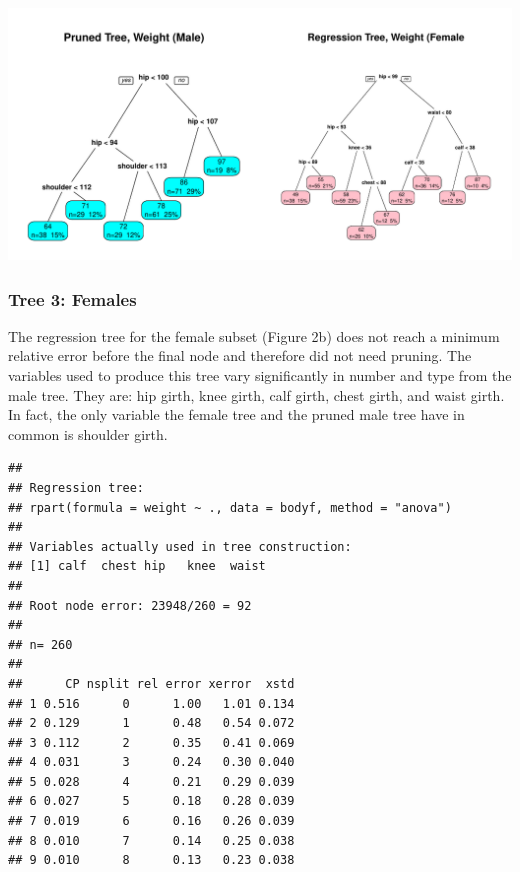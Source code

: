 \documentclass[11pt]{article}\usepackage[]{graphicx}\usepackage[]{color}
\makeatletter
\def\maxwidth{ %
  \ifdim\Gin@nat@width>\linewidth
    \linewidth
  \else
    \Gin@nat@width
  \fi
}
\newenvironment{kframe}{%
 \def\at@end@of@kframe{}%
 \ifinner\ifhmode%
  \def\at@end@of@kframe{\end{minipage}}%
  \begin{minipage}{\columnwidth}%
 \fi\fi%
 \def\FrameCommand##1{\hskip\@totalleftmargin \hskip-\fboxsep
 \colorbox{shadecolor}{##1}\hskip-\fboxsep
     \hskip-\linewidth \hskip-\@totalleftmargin \hskip\columnwidth}%
 \MakeFramed {\advance\hsize-\width
   \@totalleftmargin\z@ \linewidth\hsize
   \@setminipage}}%
 {\par\unskip\endMakeFramed%
 \at@end@of@kframe}
\newenvironment{knitrout}{}{} %
\makeatother
\begin{document}
\begin{knitrout}
\color{fgcolor}
\includegraphics[width=\maxwidth]{figure/mtrees} 

\end{knitrout}



\subsubsection{Tree 3: Females} 
The regression tree for the female subset (Figure 2b) does not reach a minimum relative error before the final node and therefore did not need pruning. The variables used to produce this tree vary significantly in number and type from the male tree. They are: hip girth, knee girth, calf girth, chest girth, and waist girth. In fact, the only variable the female tree and the pruned male tree have in common is shoulder girth.

\begin{knitrout}
\color{fgcolor}\begin{kframe}
\begin{verbatim}
## 
## Regression tree:
## rpart(formula = weight ~ ., data = bodyf, method = "anova")
## 
## Variables actually used in tree construction:
## [1] calf  chest hip   knee  waist
## 
## Root node error: 23948/260 = 92
## 
## n= 260 
## 
##      CP nsplit rel error xerror  xstd
## 1 0.516      0      1.00   1.01 0.134
## 2 0.129      1      0.48   0.54 0.072
## 3 0.112      2      0.35   0.41 0.069
## 4 0.031      3      0.24   0.30 0.040
## 5 0.028      4      0.21   0.29 0.039
## 6 0.027      5      0.18   0.28 0.039
## 7 0.019      6      0.16   0.26 0.039
## 8 0.010      7      0.14   0.25 0.038
## 9 0.010      8      0.13   0.23 0.038
\end{verbatim}
\end{kframe}
\end{knitrout}
\end{document}
